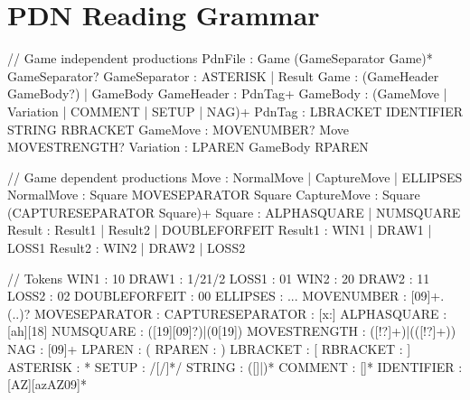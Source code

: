 \documentclass[letterpaper,10pt,english]{sphinxmanual}
\begin{document}
\section{PDN Reading Grammar}
\label{\detokenize{grammar:pdn-reading-grammar}}
\begin{sphinxVerbatim}[commandchars=\\\{\}]
// Game independent productions
PdnFile          : Game (GameSeparator Game)* GameSeparator?
GameSeparator    : ASTERISK | Result
Game             : (GameHeader GameBody?) | GameBody
GameHeader       : PdnTag+
GameBody         : (GameMove | Variation | COMMENT | SETUP | NAG)+
PdnTag           : LBRACKET IDENTIFIER STRING RBRACKET
GameMove         : MOVENUMBER? Move MOVESTRENGTH?
Variation        : LPAREN GameBody RPAREN

// Game dependent productions
Move             : NormalMove | CaptureMove | ELLIPSES
NormalMove       : Square MOVESEPARATOR Square
CaptureMove      : Square (CAPTURESEPARATOR Square)+
Square           : ALPHASQUARE | NUMSQUARE
Result           : Result1 | Result2 | DOUBLEFORFEIT
Result1          : WIN1 | DRAW1 | LOSS1
Result2          : WIN2 | DRAW2 | LOSS2

// Tokens
WIN1             : \PYGZdq{}1\PYGZhy{}0\PYGZdq{}
DRAW1            : \PYGZdq{}1\PYGZbs{}/2\PYGZhy{}1\PYGZbs{}/2\PYGZdq{}
LOSS1            : \PYGZdq{}0\PYGZhy{}1\PYGZdq{}
WIN2             : \PYGZdq{}2\PYGZhy{}0\PYGZdq{}
DRAW2            : \PYGZdq{}1\PYGZhy{}1\PYGZdq{}
LOSS2            : \PYGZdq{}0\PYGZhy{}2\PYGZdq{}
DOUBLEFORFEIT    : \PYGZdq{}0\PYGZhy{}0\PYGZdq{}
ELLIPSES         : \PYGZdq{}\PYGZbs{}.\PYGZbs{}.\PYGZbs{}.\PYGZdq{}
MOVENUMBER       : \PYGZdq{}[0\PYGZhy{}9]+\PYGZbs{}.(\PYGZbs{}.\PYGZbs{}.)?\PYGZdq{}
MOVESEPARATOR    : \PYGZdq{}\PYGZhy{}\PYGZdq{}
CAPTURESEPARATOR : \PYGZdq{}[x:]\PYGZdq{}
ALPHASQUARE      : \PYGZdq{}[a\PYGZhy{}h][1\PYGZhy{}8]\PYGZdq{}
NUMSQUARE        : \PYGZdq{}([1\PYGZhy{}9][0\PYGZhy{}9]?)|(0[1\PYGZhy{}9])\PYGZdq{}
MOVESTRENGTH     : \PYGZdq{}([\PYGZbs{}!\PYGZbs{}?]+)|(\PYGZbs{}([\PYGZbs{}!\PYGZbs{}?]+\PYGZbs{}))\PYGZdq{}
NAG              : \PYGZdq{}\PYGZbs{}\PYGZdl{}[0\PYGZhy{}9]+\PYGZdq{}
LPAREN           : \PYGZdq{}\PYGZbs{}(\PYGZdq{}
RPAREN           : \PYGZdq{}\PYGZbs{})\PYGZdq{}
LBRACKET         : \PYGZdq{}\PYGZbs{}[\PYGZdq{}
RBRACKET         : \PYGZdq{}\PYGZbs{}]\PYGZdq{}
ASTERISK         : \PYGZdq{}\PYGZbs{}*\PYGZdq{}
SETUP            : \PYGZdq{}\PYGZbs{}/[\PYGZca{}\PYGZbs{}/]*\PYGZbs{}/\PYGZdq{}
STRING           : \PYGZdq{}\PYGZbs{}\PYGZdq{}([\PYGZca{}\PYGZbs{}\PYGZdq{}]|\PYGZbs{}\PYGZbs{}\PYGZbs{}\PYGZdq{})*\PYGZbs{}\PYGZdq{}\PYGZdq{}
COMMENT          : \PYGZdq{}\PYGZbs{}\PYGZob{}[\PYGZca{}\PYGZcb{}]*\PYGZbs{}\PYGZcb{}\PYGZdq{}
IDENTIFIER       : \PYGZdq{}[A\PYGZhy{}Z][a\PYGZhy{}zA\PYGZhy{}Z0\PYGZhy{}9\PYGZus{}]*\PYGZdq{}
\end{sphinxVerbatim}
\end{document}
